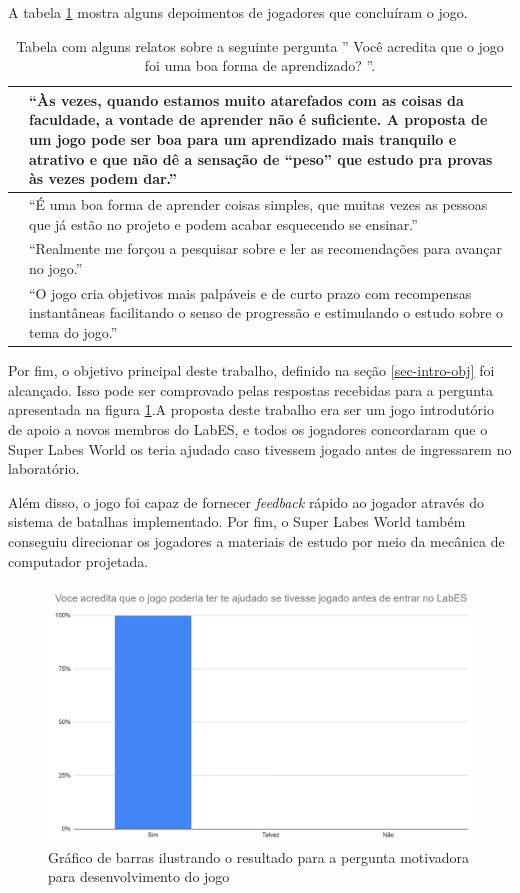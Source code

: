 A tabela \ref{tbl-relatos-jogo} mostra alguns depoimentos de jogadores que concluíram o jogo.
\begin{table}[h!]
	\caption{Tabela com alguns relatos sobre a seguinte pergunta '' Você acredita que o jogo foi uma boa forma de aprendizado? ''.}
	\label{tbl-relatos-jogo}
	\centering
	\renewcommand{\arraystretch}{2}
	\begin{small}
		\begin{tabular}{ | p{35mm} | p{100mm} |}\hline
			\centering{Pessoa 1} & ``Às vezes, quando estamos muito atarefados com as coisas da faculdade, a vontade de aprender não é suficiente. A proposta de um jogo pode ser boa para um aprendizado mais tranquilo e atrativo e que não dê a sensação de ``peso'' que estudo pra provas às vezes podem dar.'' \\\hline
			\centering{Pessoa 2} & ``É uma boa forma de aprender coisas simples, que muitas vezes as pessoas que já estão no projeto e podem acabar esquecendo se ensinar.'' \\\hline
			\centering{Pessoa 3} & ``Realmente me forçou a pesquisar sobre e ler as recomendações para avançar no jogo.'' \\\hline
                \centering{Pessoa 4} & ``O jogo cria objetivos mais palpáveis e de curto prazo com recompensas instantâneas facilitando o senso de progressão e estimulando o estudo sobre o tema do jogo.'' \\\hline
		\end{tabular}
	\end{small}
\end{table}

Por fim, o objetivo principal deste trabalho, definido na seção  \ref{sec-intro-obj} foi alcançado. Isso pode ser comprovado pelas respostas recebidas para a pergunta apresentada na figura \ref{fig:graph-1}.A proposta deste trabalho era ser um jogo introdutório de apoio a novos membros do LabES, e todos os jogadores concordaram que o Super Labes World os teria ajudado caso tivessem jogado antes de ingressarem no laboratório.

Além disso, o jogo foi capaz de fornecer \textit{feedback} rápido ao jogador através do sistema de batalhas implementado. Por fim, o Super Labes World também conseguiu direcionar os jogadores a materiais de estudo por meio da mecânica de computador projetada.

\begin{figure}[h!]
    \centering
    \includegraphics[width=0.81\linewidth]{figuras/graph-1.png}
    \caption{Gráfico de barras ilustrando o resultado para a pergunta motivadora para desenvolvimento do jogo}
    \label{fig:graph-1}
\end{figure}